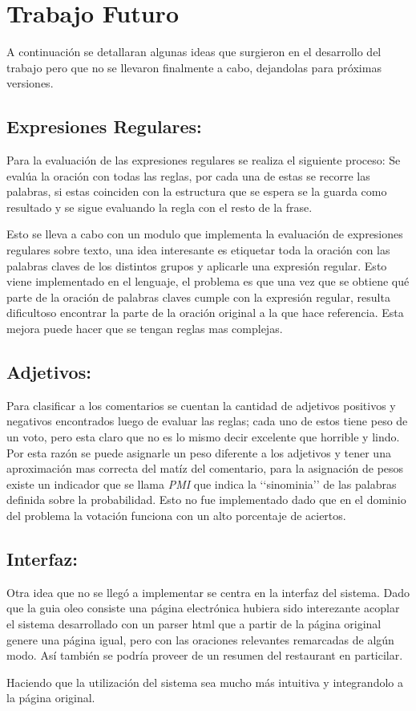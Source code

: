 \section{Trabajo Futuro}

A continuación se detallaran algunas ideas que surgieron en el
desarrollo del trabajo pero que no se llevaron finalmente a cabo, dejandolas para
próximas versiones.


\subsection{Expresiones Regulares:}

Para la evaluación de las expresiones regulares se realiza el siguiente proceso:
Se evalúa la oración con todas las reglas, por cada una de estas se
recorre las palabras, si estas coinciden con la estructura que se
espera se la guarda como resultado y se sigue evaluando la regla con el
resto de la frase.

Esto se lleva a cabo con un modulo que implementa
la evaluación de expresiones regulares sobre texto, una idea
interesante es etiquetar toda la oración con las palabras claves de
los distintos grupos y aplicarle una expresión regular. Esto viene
implementado en el lenguaje, el problema es que una vez que se
obtiene qué parte de la oración de palabras claves cumple con la
expresión regular, resulta dificultoso encontrar la parte de la oración
original a la que hace referencia. Esta mejora puede hacer que se
tengan reglas mas complejas.


\subsection{Adjetivos:}

Para clasificar a los comentarios se cuentan la cantidad de adjetivos
positivos y negativos encontrados luego de evaluar las reglas; cada
uno de estos tiene peso de un voto, pero esta claro que no es lo
mismo decir excelente que horrible y lindo. Por esta razón se puede
asignarle un peso diferente a los adjetivos y tener una aproximación
mas correcta del matíz del comentario, para la asignación de pesos
existe un indicador que se llama \emph{PMI} que indica la \lq\lq{}sinominia\rq\rq{} de las
palabras definida sobre la probabilidad. Esto no fue implementado dado
que en el dominio del problema la votación funciona con un alto
porcentaje de aciertos.

\subsection{Interfaz:}

Otra idea que no se llegó a implementar se centra en la interfaz del sistema.
Dado que la guia oleo consiste una página electrónica hubiera sido interezante acoplar el sistema desarrollado con un parser html que a partir de la página original genere una página igual, pero con las oraciones relevantes remarcadas de algún modo. Así también se podría proveer de un resumen del restaurant en particilar.

Haciendo que la utilización del sistema sea mucho más intuitiva y integrandolo a la página original.
